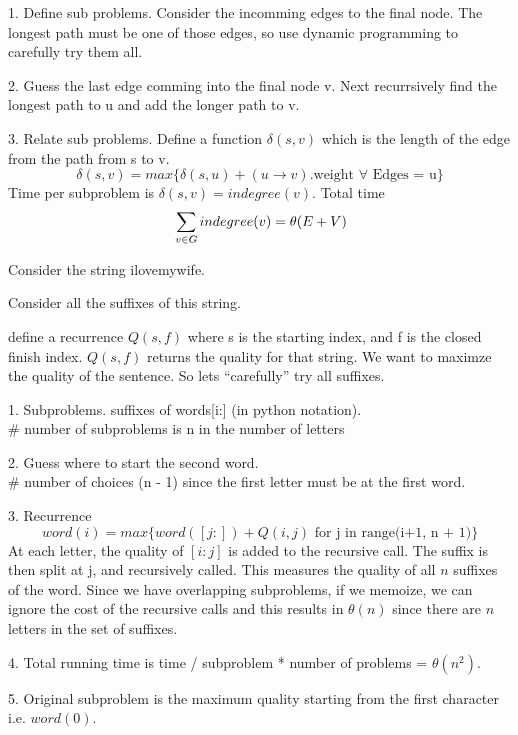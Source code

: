 \documentclass[12pt]{article}
\newenvironment{problem}[2][Problem]{\begin{trivlist}
\item[\hskip \labelsep {\bfseries #1}\hskip \labelsep {\bfseries #2.}]}{\end{trivlist}}
\begin{document}
\begin{problem}{6.3}
    1. Define sub problems. Consider the incomming edges to the final node. The
       longest path must be one of those edges, so use dynamic programming to
       carefully try them all.
    
    2. Guess the last edge comming into the final node v. Next recurrsively
       find the longest path to u and add the longer path to v. 
    
    3. Relate sub problems. Define a function $\delta(s,v)$ which is the
       length of the edge from the path from s to v. 
       \begin{equation}
           \delta(s,v) = max\{ \delta(s, u) + (u \to v).\text{weight } \forall
               \text{ Edges = u} \}
       \end{equation}
        Time per subproblem is $\delta(s,v) = indegree(v)$. 
        Total time
        \begin{equation}
            \sideset{}{}\sum_{v \in G}indegree(v) = \theta(E + V)
        \end{equation}

\end{problem}
\begin{problem}{6.5}
    Consider the string ilovemywife.

    Consider all the suffixes of this string.

    define a recurrence $Q(s,f)$ where s is the starting index, and f is the
    closed finish index. $Q(s,f)$ returns the quality for that string. We want
    to maximze the quality of the sentence. So lets ``carefully'' try all
    suffixes.

    1. Subproblems. suffixes of words[i:] (in python notation).\\
        \# number of subproblems is n in the number of letters

    2. Guess where to start the second word.\\
        \# number of choices (n - 1) since the first letter must be at the first
        word.

    3. Recurrence
        \begin{equation}
            word(i) = max\{ word([j:]) + Q(i, j) \text{ for j in range(i+1,
            n + 1)}\}
        \end{equation}
        At each letter, the quality of $[i:j]$ is added to the recursive call.
        The suffix is then split at j, and recursively called. This measures the
        quality of all $n$ suffixes of the word. Since we have overlapping
        subproblems, if we memoize, we can ignore the cost of the recursive
        calls and this results in $\theta(n)$ since there are $n$ letters in the
        set of suffixes.

    4. Total running time is time / subproblem * number of problems
       = $\theta(n^2)$.

    5. Original subproblem is the maximum quality starting from the first
       character i.e. $word(0)$. 
\end{problem}
\end{document}
